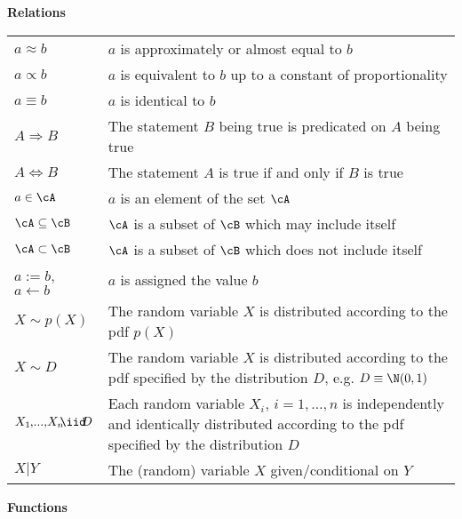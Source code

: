 \noindent\textbf{Relations}

\begin{longtable}{p{}p{}}
  $a \approx b$ & $a$ is approximately or almost equal to $b$ \\
  $a \propto b$  & $a$ is equivalent to $b$ up to a constant of proportionality \\
  $a \equiv b$  & $a$ is identical to $b$ \\  
  $A \Rightarrow B$  & The statement $B$ being true is predicated on $A$ being true \\ 
  $A \Leftrightarrow B$ & The statement $A$ is true if and only if $B$ is true \\  
  $a \in \cA$ & $a$ is an element of the set $\cA$ \\ 
  $\cA \subseteq \cB$ & $\cA$ is a subset of $\cB$ which may include itself \\      
  $\cA \subset \cB$ & $\cA$ is a subset of $\cB$ which does not include itself \\      
  $a := b$, $a \gets b$ & $a$ is assigned the value $b$ \\       
  $X \sim p(X)$ & The random variable $X$ is distributed according to the pdf $p(X)$ \\
  $X \sim D$ & The random variable $X$ is distributed according to the pdf specified by the distribution $D$, e.g. $D\equiv\N(0,1)$ \\
  $X_1\!\;\!,\! . . .,\!X_n\!\!\iid\!\! D$ & Each random variable $X_i$, $i=1,\dots,n$ is independently and identically distributed according to the pdf specified by the distribution $D$ \\  
  $X | Y$ & The (random) variable $X$ given/conditional on $Y$ \\  
\end{longtable}

\noindent\textbf{Functions}

